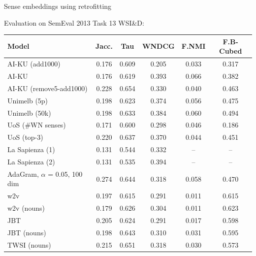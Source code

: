 \documentclass[usenames,dvipsnames]{beamer}
\begin{document}
\begin{frame}{Sense embeddings using retrofitting}

Evaluation on SemEval 2013 Task 13  WSI\&D:


	\vspace{-0.4cm}
	\begin{table}
		\scriptsize

		\begin{tabular}{l|ccc|cc}
			\bf Model & \bf Jacc. & \bf Tau & \bf WNDCG & \bf F.NMI & \bf F.B-Cubed \\ 
			\midrule
			
			AI-KU (add1000) & 0.176 & 0.609 & 0.205 & 0.033 & 0.317 \\
			AI-KU & 0.176 & 0.619 & 0.393 & 0.066 & 0.382 \\
			AI-KU (remove5-add1000) & 0.228 & 0.654 & 0.330 & 0.040 & 0.463 \\
			Unimelb (5p) & 0.198 & 0.623 & 0.374 & 0.056 & 0.475 \\
			Unimelb (50k) & 0.198 & 0.633 & 0.384 & 0.060 & 0.494 \\
			UoS (\#WN senses) & 0.171 & 0.600 & 0.298 & 0.046 & 0.186 \\
			UoS (top-3) & 0.220 & 0.637 & 0.370 & 0.044 & 0.451 \\
			La Sapienza (1) & 0.131 & 0.544 & 0.332 & --  & -- \\
			La Sapienza (2) & 0.131 & 0.535 & 0.394 & -- & -- \\ \midrule
			AdaGram, $\alpha$ = 0.05, 100 dim & 0.274 & 0.644  & 0.318  & 0.058  & 0.470  \\ \midrule
			\alert{w2v}  & 0.197 & 0.615 & 0.291 & 0.011 & 0.615 \\
			\alert{w2v (nouns)} & 0.179 & 0.626 & 0.304 & 0.011 & 0.623 \\
			
			\alert{JBT} & 0.205 & 0.624 & 0.291 & 0.017 & 0.598\\
			\alert{JBT (nouns)} & 0.198 & 0.643 & 0.310 & 0.031 & 0.595\\
			\alert{TWSI (nouns)} & 0.215 & 0.651 & 0.318 & 0.030 & 0.573 \\ 
				
		\end{tabular}
		\end{table}
\end{frame}
\end{document}
